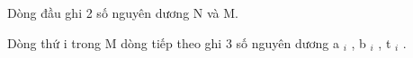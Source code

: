 Dòng đầu ghi 2 số nguyên dương N và M.

Dòng thứ i trong M dòng tiếp theo ghi 3 số nguyên dương a $_ i $ , b $_ i $ , t $_ i $ .

\